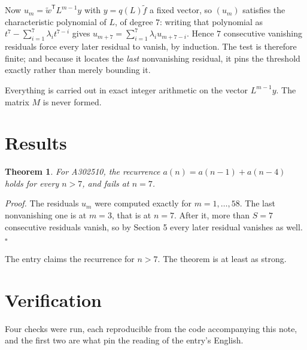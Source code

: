 \documentclass[11pt]{article}
\newtheorem{theorem}{Theorem}
\theoremstyle{definition}
\begin{document}
Now $u_m = \tilde w^{\mathsf T} L^{m-1} y$ with $y = q(L)\tilde f$ a fixed vector, so $(u_m)$ satisfies the characteristic polynomial of $L$, of degree $7$: writing that polynomial as $t^{7} - \sum_{i=1}^{7} \lambda_i t^{7-i}$ gives $u_{m+7} = \sum_{i=1}^{7} \lambda_i u_{m+7-i}$. Hence $7$ consecutive vanishing residuals force every later residual to vanish, by induction. The test is therefore finite; and because it locates the {\itshape last} nonvanishing residual, it pins the threshold exactly rather than merely bounding it.

Everything is carried out in exact integer arithmetic on the vector $L^{m-1}y$. The matrix $M$ is never formed.

\section{Results}

\begin{theorem} For A302510, the recurrence $a(n) = a(n-1) + a(n-4)$ holds for every $n > 7$, and fails at $n = 7$.\end{theorem}

{\itshape Proof.} The residuals $u_m$ were computed exactly for $m = 1,\dots,58$. The last nonvanishing one is at $m = 3$, that is at $n = 7$. After it, more than $S = 7$ consecutive residuals vanish, so by Section 5 every later residual vanishes as well. $\square$

The entry claims the recurrence for $n > 7$. The theorem is at least as strong.

\section{Verification}

Four checks were run, each reproducible from the code accompanying this note, and the first two are what pin the reading of the entry's English.
\end{document}
